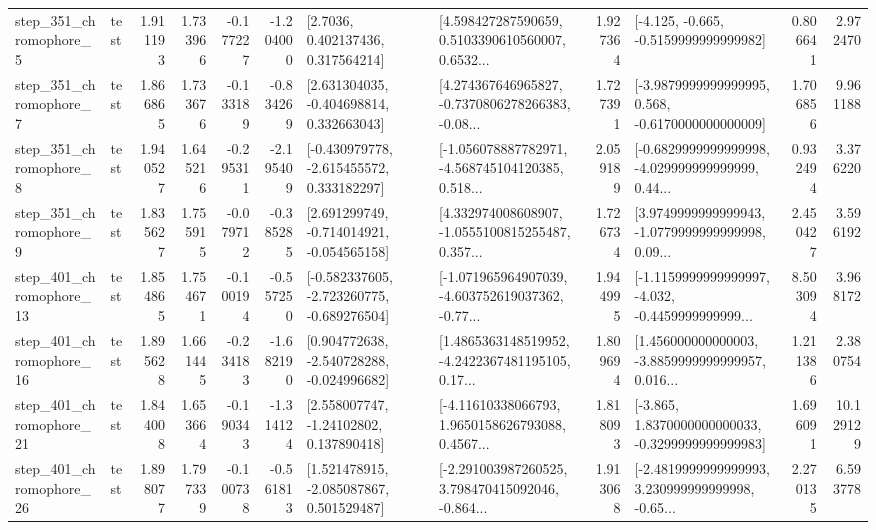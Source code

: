 \begin{tabular}{llrrrrllrlrr}
   step\_351\_chromophore\_5 &      test &      1.911193 &    1.733966 &     -0.177227 & -1.204000 &          [2.7036, 0.402137436, 0.317564214] &  [4.598427287590659, 0.5103390610560007, 0.6532... &       1.927364 &              [-4.125, -0.665, -0.5159999999999982] &            0.806641 &          2.972470 \\
   step\_351\_chromophore\_7 &      test &      1.866865 &    1.733676 &     -0.133189 & -0.834269 &    [2.631304035, -0.404698814, 0.332663043] &  [4.274367646965827, -0.7370806278266383, -0.08... &       1.727391 &  [-3.9879999999999995, 0.568, -0.6170000000000009] &            1.706856 &          9.961188 \\
   step\_351\_chromophore\_8 &      test &      1.940527 &    1.645216 &     -0.295311 & -2.195409 &   [-0.430979778, -2.615455572, 0.333182297] &  [-1.056078887782971, -4.568745104120385, 0.518... &       2.059189 &  [-0.6829999999999998, -4.029999999999999, 0.44... &            0.932494 &          3.376220 \\
   step\_351\_chromophore\_9 &      test &      1.835627 &    1.755915 &     -0.079712 & -0.385285 &   [2.691299749, -0.714014921, -0.054565158] &  [4.332974008608907, -1.0555100815255487, 0.357... &       1.726734 &  [3.9749999999999943, -1.0779999999999998, 0.09... &            2.450427 &          3.596192 \\
  step\_401\_chromophore\_13 &      test &      1.854865 &    1.754671 &     -0.100194 & -0.557250 &  [-0.582337605, -2.723260775, -0.689276504] &  [-1.071965964907039, -4.603752619037362, -0.77... &       1.944995 &  [-1.1159999999999997, -4.032, -0.4459999999999... &            8.503094 &          3.968172 \\
  step\_401\_chromophore\_16 &      test &      1.895628 &    1.661445 &     -0.234183 & -1.682190 &   [0.904772638, -2.540728288, -0.024996682] &  [1.4865363148519952, -4.2422367481195105, 0.17... &       1.809694 &  [1.456000000000003, -3.8859999999999957, 0.016... &            1.211386 &          2.380754 \\
  step\_401\_chromophore\_21 &      test &      1.844008 &    1.653664 &     -0.190343 & -1.314124 &     [2.558007747, -1.24102802, 0.137890418] &  [-4.11610338066793, 1.9650158626793088, 0.4567... &       1.818093 &  [-3.865, 1.8370000000000033, -0.3299999999999983] &            1.696091 &         10.129129 \\
  step\_401\_chromophore\_26 &      test &      1.898077 &    1.797339 &     -0.100738 & -0.561813 &    [1.521478915, -2.085087867, 0.501529487] &  [-2.291003987260525, 3.798470415092046, -0.864... &       1.913068 &  [-2.4819999999999993, 3.230999999999998, -0.65... &            2.270135 &          6.593778 \\

\end{tabular}
